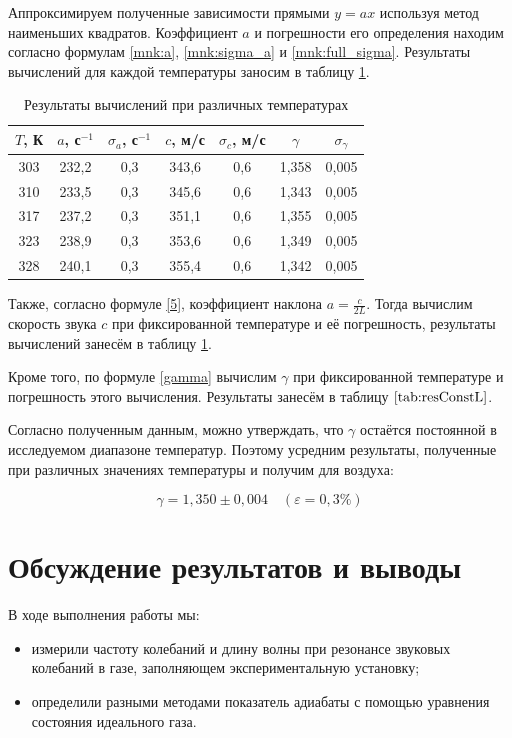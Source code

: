 \documentclass[a4paper,12pt]{article} %
\begin{document}
Аппроксимируем полученные зависимости прямыми $ y=ax $ используя метод наименьших квадратов. Коэффициент $ a $ и погрешности его определения находим согласно формулам \eqref{mnk:a}, \eqref{mnk:sigma_a} и \eqref{mnk:full_sigma}. Результаты вычислений для каждой температуры заносим в таблицу \ref{tab:resConstL}.

\begin{table}[H]
	\centering
	\begin{tabular}{|c|c|c|c|c|c|c|}
		\hline
		$ T $, К & $ a $, с$ ^{-1} $ & $ \sigma_a $, с$ ^{-1} $ & $ c $, м/с & $ \sigma_c $, м/с & $ \gamma $ & $ \sigma_\gamma $ \\ \hline
		303 & 232,2 & 0,3 & 343,6 & 0,6 & 1,358 & 0,005 \\ \hline
		310 & 233,5 & 0,3 & 345,6 & 0,6 & 1,343 & 0,005 \\ \hline
		317 & 237,2 & 0,3 & 351,1 & 0,6 & 1,355 & 0,005 \\ \hline
		323 & 238,9 & 0,3 & 353,6 & 0,6 & 1,349 & 0,005 \\ \hline
		328 & 240,1 & 0,3 & 355,4 & 0,6 & 1,342 & 0,005 \\ \hline
	\end{tabular}
	\caption{Результаты вычислений при различных температурах}
	\label{tab:resConstL}
\end{table}

Также, согласно формуле \eqref{5}, коэффициент наклона $ \displaystyle a = \frac{c}{2L}$. Тогда вычислим скорость звука $ c $ при фиксированной температуре и её погрешность, результаты вычислений занесём в таблицу \ref{tab:resConstL}.

Кроме того, по формуле \eqref{gamma} вычислим $ \gamma $ при фиксированной температуре и погрешность этого вычисления. Результаты занесём в таблицу $ \ref{tab:resConstL} $. 

Согласно полученным данным, можно утверждать, что $ \gamma $ остаётся постоянной в исследуемом диапазоне температур. Поэтому усредним результаты, полученные при различных значениях температуры и получим для воздуха:

\[ \boxed{\gamma = 1,350 \pm 0,004}\quad (\varepsilon=0,3\%) \]

\section{Обсуждение результатов и выводы}

В ходе выполнения работы мы:

\begin{itemize}
	\item измерили частоту колебаний и длину волны при резонансе звуковых колебаний в газе, заполняющем экспериментальную установку;
	\item определили разными методами показатель адиабаты с помощью уравнения состояния идеального газа.
\end{itemize}
\end{document}
